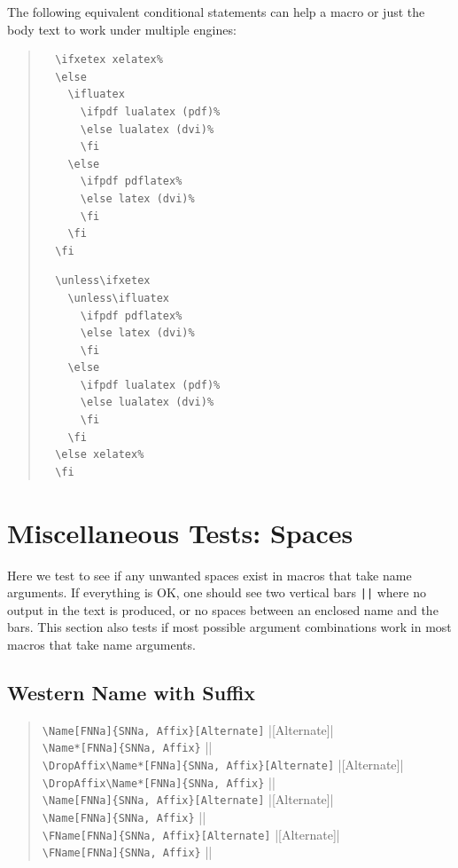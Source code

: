 \documentclass[oneside]{article}
\begin{document}
The following equivalent conditional statements can help a macro
or just the body text to work under multiple engines:
\begin{quote}\small
\begin{Verbatim}
  \ifxetex xelatex%
  \else
    \ifluatex
      \ifpdf lualatex (pdf)%
      \else lualatex (dvi)%
      \fi
    \else
      \ifpdf pdflatex%
      \else latex (dvi)%
      \fi
    \fi
  \fi
\end{Verbatim}

\begin{Verbatim}
  \unless\ifxetex
    \unless\ifluatex
      \ifpdf pdflatex%
      \else latex (dvi)%
      \fi
    \else
      \ifpdf lualatex (pdf)%
      \else lualatex (dvi)%
      \fi
    \fi
  \else xelatex%
  \fi
\end{Verbatim}
\end{quote}

%
%

\section{Miscellaneous Tests: Spaces}

Here we test to see if any unwanted spaces exist in macros that take
name arguments. If everything is OK, one should see two vertical bars
\texttt{||} where no output in the text is produced, or no spaces
between an enclosed name and the bars. This section also tests if most
possible argument combinations work in most macros that take name arguments.

\subsection{Western Name with Suffix}

\begin{quote}
\Verb+\Name[FNNa]{SNNa, Affix}[Alternate]+\dotfill
  |[Alternate]|\\
\Verb+\Name*[FNNa]{SNNa, Affix}+\dotfill
  ||\\
\Verb+\DropAffix\Name*[FNNa]{SNNa, Affix}[Alternate]+\dotfill
  |\DropAffix{}[Alternate]|\\
\Verb+\DropAffix\Name*[FNNa]{SNNa, Affix}+\dotfill
  |\DropAffix{}|\\
\Verb+\Name[FNNa]{SNNa, Affix}[Alternate]+\dotfill
  |[Alternate]|\\
\Verb+\Name[FNNa]{SNNa, Affix}+\dotfill
  ||\\
\Verb+\FName[FNNa]{SNNa, Affix}[Alternate]+\dotfill
  |[Alternate]|\\
\Verb+\FName[FNNa]{SNNa, Affix}+\dotfill
  ||
\end{quote}
\end{document}
